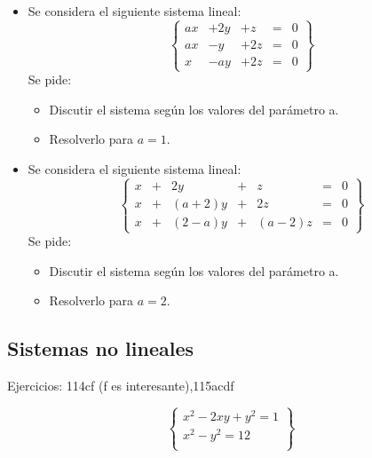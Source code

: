 \begin{itemize}
\item Se considera el siguiente sistema lineal:\[
\left\{\begin{array}{ccccc}
ax&+2y&+z&=&0\\
ax&-y&+2z&=&0\\
x&-ay&+2z&=&0
\end{array}\right\}
\]
Se pide:
\begin{itemize}
	\item Discutir el sistema según los valores del parámetro a.
	\item Resolverlo para $a=1$.
\end{itemize}

\item Se considera el siguiente sistema lineal:
\[\left\{\begin{array}{rcrcrcl}
x&+&2y&+&z&=&0\\
x&+&(a+2)y&+&2z&=&0\\
x&+&(2-a)y&+&(a-2)z&=&0
\end{array}\right\}
\]
Se pide:
\begin{itemize}
	\item Discutir el sistema según los valores del parámetro a.
	\item Resolverlo para $a=2$.
\end{itemize}

\end{itemize}

\subsection{Sistemas no lineales}

Ejercicios: 114cf (f es interesante),115acdf

\[
\left\{
	\begin{array}{c}
		x^2-2xy+y^2 = 1\\
		x^2-y^2 = 12\\
	\end{array}
\right\}
\]